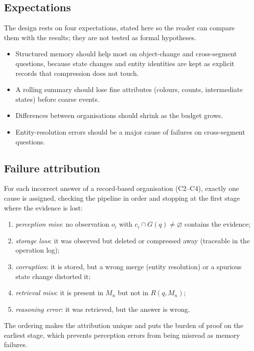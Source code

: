 \subsection{Expectations}
The design rests on four expectations, stated here so the reader can compare
them with the results; they are not tested as formal hypotheses.
\begin{itemize}[nosep]
\item Structured memory should help most on object-change and cross-segment
  questions, because state changes and entity identities are kept as explicit
  records that compression does not touch.
\item A rolling summary should lose fine attributes (colours, counts,
  intermediate states) before coarse events.
\item Differences between organisations should shrink as the budget grows.
\item Entity-resolution errors should be a major cause of failures on
  cross-segment questions.
\end{itemize}

\subsection{Failure attribution}\label{sec:attribution}
For each incorrect answer of a record-based organisation (C2--C4), exactly one
cause is assigned, checking the pipeline in order and stopping at the first
stage where the evidence is lost:
\begin{enumerate}[nosep]
  \item \emph{perception miss}: no observation $o_i$ with $c_i\cap G(q)\neq\varnothing$
        contains the evidence;
  \item \emph{storage loss}: it was observed but deleted or compressed away
        (traceable in the operation log);
  \item \emph{corruption}: it is stored, but a wrong merge (entity resolution)
        or a spurious state change distorted it;
  \item \emph{retrieval miss}: it is present in $M_n$ but not in $R(q,M_n)$;
  \item \emph{reasoning error}: it was retrieved, but the answer is wrong.
\end{enumerate}
The ordering makes the attribution unique and puts the burden of proof on the
earliest stage, which prevents perception errors from being misread as memory
failures.


